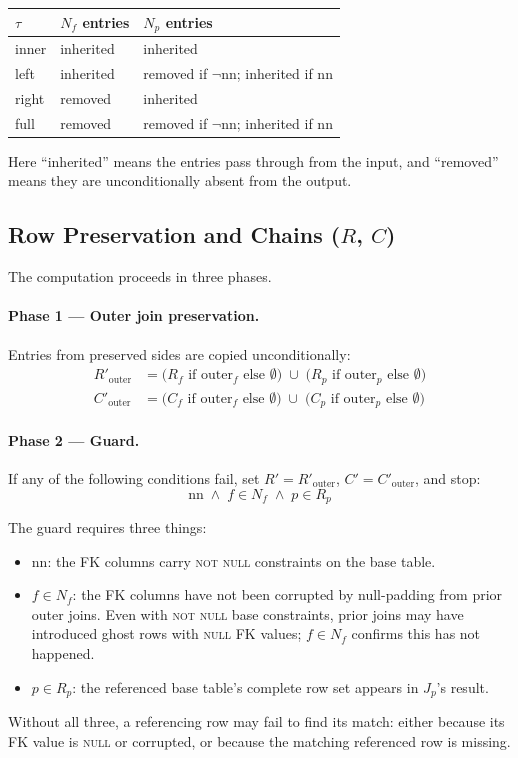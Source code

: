 \documentclass[11pt]{article}
\theoremstyle{definition}
\newcommand{\Rf}{R_f}
\newcommand{\Rp}{R_p}
\newcommand{\Nf}{N_f}
\newcommand{\Np}{N_p}
\newcommand{\Cf}{C_f}
\newcommand{\Cp}{C_p}
\newcommand{\Jp}{J_p}
\newcommand{\outerf}{\mathrm{outer}_f}
\newcommand{\outerp}{\mathrm{outer}_p}
\newcommand{\nn}{\mathrm{nn}}
\begin{document}
\begin{center}
\begin{tabular}{lll}
\toprule
$\tau$ & $\Nf$ entries & $\Np$ entries \\
\midrule
inner & inherited & inherited \\
left  & inherited & removed if $\lnot\nn$;\; inherited if $\nn$ \\
right & removed   & inherited \\
full  & removed   & removed if $\lnot\nn$;\; inherited if $\nn$ \\
\bottomrule
\end{tabular}
\end{center}

Here ``inherited'' means the entries pass through from the input, and
``removed'' means they are unconditionally absent from the output.


\subsection{Row Preservation and Chains (\texorpdfstring{$R$, $C$}{R, C})}

The computation proceeds in three phases.

\paragraph{Phase 1 --- Outer join preservation.}
Entries from preserved sides are copied unconditionally:
\begin{align*}
  R'_{\mathrm{outer}} &=
    \bigl(\Rf \text{ if } \outerf \text{ else } \emptyset\bigr)
    \;\cup\;
    \bigl(\Rp \text{ if } \outerp \text{ else } \emptyset\bigr)
  \\
  C'_{\mathrm{outer}} &=
    \bigl(\Cf \text{ if } \outerf \text{ else } \emptyset\bigr)
    \;\cup\;
    \bigl(\Cp \text{ if } \outerp \text{ else } \emptyset\bigr)
\end{align*}

\paragraph{Phase 2 --- Guard.}
If any of the following conditions fail, set
$R' = R'_{\mathrm{outer}}$, $C' = C'_{\mathrm{outer}}$, and stop:
\[
  \nn \;\land\; f \in \Nf \;\land\; p \in \Rp
\]

The guard requires three things:
\begin{itemize}[nosep]
\item $\nn$: the FK columns carry \textsc{not null} constraints on the
  base table.
\item $f \in \Nf$: the FK columns have not been corrupted by
  null-padding from prior outer joins.  Even with \textsc{not null}
  base constraints, prior joins may have introduced ghost rows with
  \textsc{null} FK values; $f \in \Nf$ confirms this has not happened.
\item $p \in \Rp$: the referenced base table's complete row set
  appears in $\Jp$'s result.
\end{itemize}
Without all three, a referencing row may fail to find its match:
either because its FK value is \textsc{null} or corrupted, or because
the matching referenced row is missing.
\end{document}
